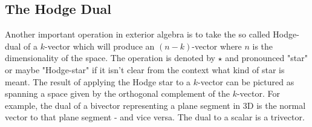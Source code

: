 
\subsection{The Hodge Dual}
Another important operation in exterior algebra is to take the so called Hodge-dual of a $k$-vector which will produce an $(n-k)$-vector where $n$ is the dimensionality of the space. The operation is denoted by $\star$ and pronounced "star" or maybe "Hodge-star" if it isn't clear from the context what kind of star is meant. The result of applying the Hodge star to a $k$-vector can be pictured as spanning a space given by the orthogonal complement of the $k$-vector. For example, the dual of a bivector representing a plane segment in 3D is the normal vector to that plane segment - and vice versa. The dual to a scalar is a trivector.



\begin{comment}

-explain covectors, co-scalars
-explain k-forms: a 1-form is a device to measure the length of a vector, a 2-from measures the area of 
 a bivector, a 3-form measures the volume of a trivector. in general, a k-form takes a k-vector as input
 and produces a scalar. can we also picture it as taking k 1-vectors? i think so. when this is done, it is 
 an alternating an multilinear function. i was always confused by thinking covectors are the same thing as 1-forms...but i think that's false? or is it? maybe we can have covectors, cobivectors, etc?

resources:
https://en.wikipedia.org/wiki/Exterior_algebra
https://de.wikipedia.org/wiki/Gra%

https://math.wikia.org/wiki/Dot_product
https://math.wikia.org/wiki/Wedge_product
https://math.wikia.org/wiki/Cross_product
https://math.wikia.org/wiki/Pseudovector
https://math.wikia.org/wiki/Scalar_triple_product
https://math.wikia.org/wiki/Vector_triple_product

https://en.wikipedia.org/wiki/Graded_vector_space

https://en.wikipedia.org/wiki/Multilinear_algebra

https://en.wikipedia.org/wiki/Hodge_star_operator
https://de.wikipedia.org/wiki/Hodge-Stern-Operator
https://www.youtube.com/watch?v=tyaWHQO-wSc
https://en-academic.com/dic.nsf/enwiki/186276
https://handwiki.org/wiki/Hodge_star_operator  good!


\end{comment}